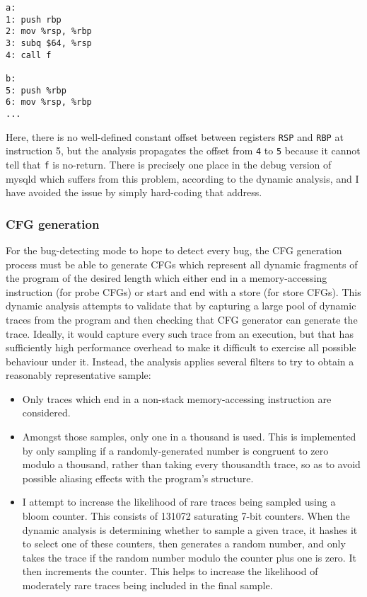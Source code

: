 \begin{verbatim}
a:
1: push rbp
2: mov %rsp, %rbp
3: subq $64, %rsp
4: call f

b:
5: push %rbp
6: mov %rsp, %rbp
...
\end{verbatim}

Here, there is no well-defined constant offset between registers \verb|RSP| and \verb|RBP| at instruction 5, but the analysis propagates the offset from \verb|4| to \verb|5| because it cannot tell that \verb|f| is no-return.
There is precisely one place in the debug version of mysqld which suffers from this problem, according to the dynamic analysis, and I have avoided the issue by simply hard-coding that address.


\subsubsection{CFG generation}

For the bug-detecting mode to hope to detect every bug, the CFG generation process must be able to generate CFGs which represent all dynamic fragments of the program of the desired length which either end in a memory-accessing instruction (for probe CFGs) or start and end with a store (for store CFGs).
This dynamic analysis attempts to validate that by capturing a large pool of dynamic traces from the program and then checking that CFG generator can generate the trace.
Ideally, it would capture every such trace from an execution, but that has sufficiently high performance overhead to make it difficult to exercise all possible behaviour under it.
Instead, the analysis applies several filters to try to obtain a reasonably representative sample:

\begin{itemize}
\item
  Only traces which end in a non-stack memory-accessing instruction are considered.
\item
  Amongst those samples, only one in a thousand is used.
  This is implemented by only sampling if a randomly-generated number is congruent to zero modulo a thousand, rather than taking every thousandth trace, so as to avoid possible aliasing effects with the program's structure.
\item
  I attempt to increase the likelihood of rare traces being sampled using a bloom counter.
  This consists of 131072 saturating 7-bit counters.
  When the dynamic analysis is determining whether to sample a given trace, it hashes it to select one of these counters, then generates a random number, and only takes the trace if the random number modulo the counter plus one is zero.
  It then increments the counter.
  This helps to increase the likelihood of moderately rare traces being included in the final sample.
\end{itemize}

